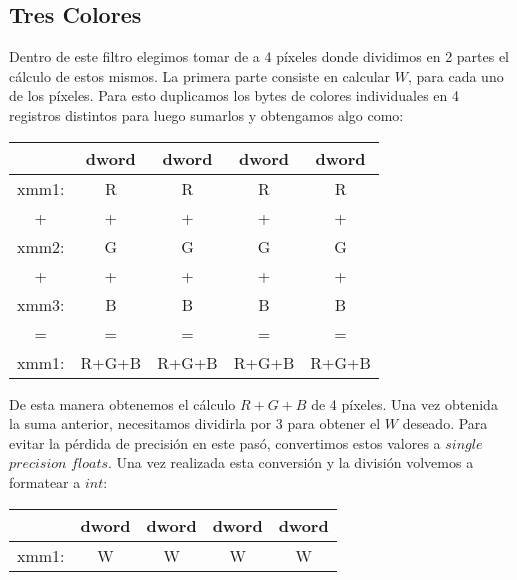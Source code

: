 \vspace{5px}
\subsection{Tres Colores} 

Dentro de este filtro elegimos tomar de a 4 píxeles donde dividimos en 2 partes el cálculo de estos mismos. 
La primera parte consiste en calcular $W$, para cada uno de los píxeles. Para esto duplicamos los bytes de colores individuales en 4 registros distintos para luego sumarlos y obtengamos algo como:

\begin{table}[h]
\begin{center}
\begin{tabular}{|c|c|c|c|c|}
\hline
      & dword     & dword     & dword     & dword     \\ \hline
xmm1: & R     & R     & R     & R     \\ \hline
+     & +     & +     & +     & +     \\ \hline
xmm2: & G     & G     & G     & G     \\ \hline
+     & +     & +     & +     & +     \\ \hline
xmm3: & B     & B     & B     & B     \\ \hline
=     & =     & =     & =     & =     \\ \hline
xmm1: & R+G+B & R+G+B & R+G+B & R+G+B \\ \hline
\end{tabular}
\end{center}
\end{table}

De esta manera obtenemos el cálculo $R+G+B$ de 4 píxeles. Una vez obtenida la suma anterior, necesitamos dividirla por 3 para obtener el $W$ deseado. Para evitar la pérdida de precisión en este pasó, convertimos estos valores a $single$ $precision$ $floats$. Una vez realizada esta conversión y la división volvemos a formatear a $int$:

\begin{table}[h]
\begin{center}
\begin{tabular}{|c|c|c|c|c|}
\hline
      & dword     & dword     & dword     & dword     \\ \hline
xmm1: & W     & W     & W     & W     \\ \hline
\end{tabular}
\end{center}
\end{table}

